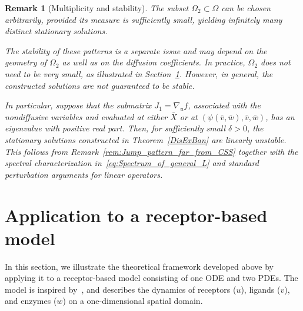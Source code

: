 \documentclass[12pt, a4paper]{amsart}
\numberwithin{equation}{section}
\newcommand{\CSS}{\bar{X}}
\newcommand{\Cun}{\bar{\un}}
\newcommand{\Cus}{\bar{\us}}
\newcommand{\Cuf}{\bar{\uf}}
\newcommand{\un}{u}
\newcommand{\us}{v}
\newcommand{\uf}{w}
\newtheorem{remark}[theorem]{\bf Remark}
\begin{document}
\begin{remark}[Multiplicity and stability]
The subset $\Omega_2\subset\Omega$ can be chosen arbitrarily, provided its measure is sufficiently small, yielding infinitely many distinct stationary solutions.  

The stability of these patterns is a separate issue and may depend on the geometry of $\Omega_2$ as well as on the diffusion coefficients.
In practice, $\Omega_2$ does not need to be very small, as illustrated in Section~\ref{sec:Application}.
However, in general, the constructed solutions are not guaranteed to be stable.

In particular, suppose that the submatrix $J_1 = \nabla_{\un} f$, associated with the nondiffusive variables and evaluated at either $\CSS$ or at $(\psi(\Cus,\Cuf),\Cus,\Cuf)$, has an eigenvalue with positive real part.
Then, for sufficiently small $\delta>0$, the stationary solutions constructed in Theorem~\ref{DisExBan} are linearly unstable. This follows from Remark~\ref{rem:Jump_pattern_far_from_CSS} together with the spectral characterization in~\eqref{eq:Spectrum_of_general_L} and standard perturbation arguments for linear operators.
\end{remark}

\section{Application to a receptor-based model}\label{sec:Application}

In this section, we illustrate the theoretical framework developed above by applying it to a receptor-based model consisting of one ODE and two PDEs. The model is inspired by~\cite{Marciniak06}, and describes the dynamics of receptors (\(u\)), ligands (\(v\)), and enzymes (\(w\)) on a one-dimensional spatial domain.
\end{document}
